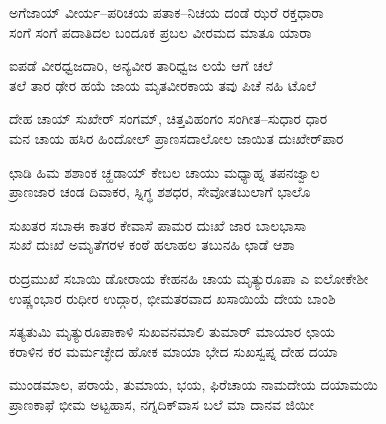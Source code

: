 
\begin{myquote}
ಅಗೆಜಾಯ್ ವೀರ್ಯ–ಪರಿಚಯ ಪತಾಕ–ನಿಚಯ ದಂಡೆ ಝರೆ ರಕ್ತಧಾರಾ\\ಸಂಗೆ ಸಂಗೆ ಪದಾತಿದಲ ಬಂದೂಕ ಪ್ರಬಲ ವೀರಮದ ಮಾತೂ ಯಾರಾ
\end{myquote}


\begin{myquote}
ಐಪಡೆ ವೀರಧ್ವಜದಾರಿ, ಅನ್ಯವೀರ ತಾರಿಧ್ವಜ ಲಯೆ ಆಗೆ ಚಲೆ\\ತಲೆ ತಾರ ಢೇರ ಹಯೆ ಜಾಯ ಮೃತವೀರಕಾಯ ತವು ಪಿಚೆ ನಹಿ ಟೊಲೆ
\end{myquote}


\begin{myquote}
ದೇಹ ಚಾಯ್ ಸುಖೇರ್ ಸಂಗಮ್, ಚಿತ್ತವಿಹಂಗಂ ಸಂಗೀತ–ಸುಧಾರ ಧಾರ\\ಮನ ಚಾಯ ಹಸಿರ ಹಿಂದೋಲ್ ಪ್ರಾಣಸದಾಲೋಲ ಜಾಯಿತ ದುಃಖೇರ್‌ಪಾರ
\end{myquote}


\begin{myquote}
ಛಾಡಿ ಹಿಮ ಶಶಾಂಕ ಚ್ಹಡಾಯ್ ಕೇಬಲ ಚಾಯು ಮಧ್ಯಾಹ್ನ ತಪನಜ್ವಾಲ\\ಪ್ರಾಣಜಾರ ಚಂಡ ದಿವಾಕರ, ಸ್ನಿಗ್ಧ ಶಶಧರ, ಸೇವೋತಬುಲಾಗೆ ಭಾಲೊ
\end{myquote}


\begin{myquote}
ಸುಖತರ ಸಬಾಈ ಕಾತರ ಕೇವಾಸೆ ಪಾಮರ ದುಃಖೆ ಜಾರ ಬಾಲಭಾಸಾ\\ಸುಖೆ ದುಃಖೆ ಅಮೃತೆಗರಳ ಕಂಠೆ ಹಲಾಹಲ ತಬುನಹಿ ಛಾಡೆ ಆಶಾ
\end{myquote}


\begin{myquote}
ರುದ್ರಮುಖೆ ಸಬಾಯಿ ಡೋರಾಯ ಕೇಹನಹಿ ಚಾಯ ಮೃತ್ಯುರೂಪಾ ಎ ಐಲೋಕೇಶೀ\\ಉಷ್ಣಂಭಾರ ರುಧೀರ ಉದ್ಗಾರ, ಭೀಮತರವಾದ ಖಸಾಯಿಯೆ ದೇಯ ಬಾಂಶಿ
\end{myquote}


\begin{myquote}
ಸತ್ಯತುಮಿ ಮೃತ್ಯುರೂಪಾಕಾಳಿ ಸುಖವನಮಾಲಿ ತುಮಾರ್‌ ಮಾಯಾರ ಛಾಯ\\ಕರಾಳಿನ ಕರ ಮರ್ಮಚ್ಛೇದ ಹೋಕ ಮಾಯಾ ಭೇದ ಸುಖಸ್ವಪ್ನ ದೇಹ ದಯಾ
\end{myquote}


\begin{myquote}
ಮುಂಡಮಾಲ, ಪರಾಯೆ, ತುಮಾಯ, ಭಯ, ಫಿರೆಚಾಯ ನಾಮದೇಯ ದಯಾಮಯಿ\\ಪ್ರಾಣಕಾಫೆ ಭೀಮ ಅಟ್ಟಹಾಸ, ನಗ್ನದಿಕ್‌ವಾಸ ಬಲೆ ಮಾ ದಾನವ ಜಿಯೀ
\end{myquote}

